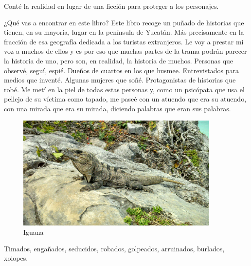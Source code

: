 \documentclass[12pt,twoside,openright,a5paper]{book}
\begin{document}
Conté la realidad en lugar de una ficción para proteger a los personajes.


\vspace{0.5cm}
\hrulefill\hspace{0.2cm} \decofourleft\decofourright \hspace{0.2cm} \hrulefill
\vspace{0.5cm}

¿Qué vas a encontrar en este libro? Este libro recoge un puñado
de historias que tienen, en su mayoría, lugar en la península de
Yucatán. Más precisamente en la fracción de esa geografía dedicada a
los turistas extranjeros. Le voy a prestar mi voz a muchos de ellos y es
por eso que muchas partes de la trama podrán parecer la historia de uno,
pero son, en realidad, la historia de muchos. Personas que observé, seguí,
espié. Dueños de cuartos en los que husmee. Entrevistados para medios
que inventé. Algunas mujeres que soñé. Protagonistas de historias que
robé. Me metí en la piel de todas estas personas y, como un psicópata
que usa el pellejo de su víctima como tapado, me paseé con un atuendo
que era su atuendo, con una mirada que era su mirada, diciendo palabras
que eran sus palabras.

\begin{figure}[H]
  \centering
    \includegraphics[width=0.9\textwidth]{fotos/2013/iguana}
  \caption{Iguana}
  \label{Iguana}
\end{figure}


\vspace{0.5cm}
\hrulefill\hspace{0.2cm} \decofourleft\decofourright \hspace{0.2cm} \hrulefill
\vspace{0.5cm}

Timados, engañados, seducidos, robados, golpeados, arruinados, burlados, xolopes.
\end{document}
